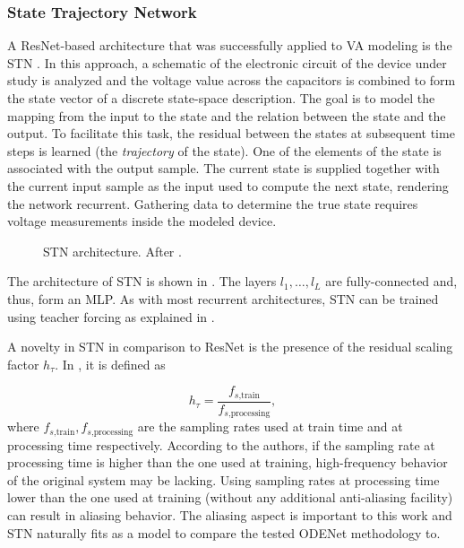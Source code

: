 \subsubsection{State Trajectory Network}

A \ac{ResNet}-based architecture that was successfully applied to \ac{VA} modeling is the \acf{STN} \cite{Parker2019}. In this approach, a schematic of the electronic circuit of the device under study is analyzed and the voltage value across the capacitors is combined to form the state vector of a discrete state-space description. The goal is to model the mapping from the input to the state and the relation between the state and the output. To facilitate this task, the residual between the states at subsequent time steps is learned (the \emph{trajectory} of the state). One of the elements of the state is associated with the output sample. The current state is supplied together with the current input sample as the input used to compute the next state, rendering the network recurrent. Gathering data to determine the true state requires voltage measurements inside the modeled device. 

\begin{figure}
  \centering
  \scalebox{0.7}{}
  \caption{\Acf{STN} architecture. After \cite{Parker2019}.}
  \label{fig:stn}
\end{figure}

The architecture of \ac{STN} is shown in . The layers $l_1, \dots, l_L$ are fully-connected and, thus, form an \ac{MLP}. As with most recurrent architectures, \ac{STN} can be trained using teacher forcing as explained in  \cite{Parker2019}. 

A novelty in \ac{STN} in comparison to \ac{ResNet} is the presence of the residual scaling factor $h_\tau$. In \cite{Parker2019}, it is defined as

\begin{equation}
  h_\tau = \frac{f_{s\text{,train}}}{f_{s\text{,processing}}},
\end{equation}
where $f_{s\text{,train}}, f_{s\text{,processing}}$ are the sampling rates used at train time and at processing time respectively. According to the authors, if the sampling rate at processing time is higher than the one used at training, high-frequency behavior of the original system may be lacking. Using sampling rates at processing time lower than the one used at training (without any additional anti-aliasing facility) can result in aliasing behavior. The aliasing aspect is important to this work and \ac{STN} naturally fits as a model to compare the tested ODENet methodology to.


